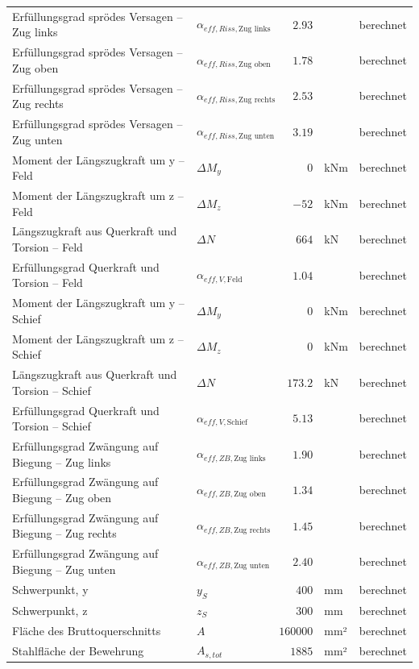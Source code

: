 \documentclass[11pt,a4paper]{article}
\begin{document}
\begin{xltabular}{\linewidth}{>{\raggedright\arraybackslash}Xlrll}
Erfüllungsgrad sprödes Versagen – Zug links & $\alpha_{eff,Riss,\text{Zug links}}$ & $2.93$ &  & berechnet \\
Erfüllungsgrad sprödes Versagen – Zug oben & $\alpha_{eff,Riss,\text{Zug oben}}$ & $1.78$ &  & berechnet \\
Erfüllungsgrad sprödes Versagen – Zug rechts & $\alpha_{eff,Riss,\text{Zug rechts}}$ & $2.53$ &  & berechnet \\
Erfüllungsgrad sprödes Versagen – Zug unten & $\alpha_{eff,Riss,\text{Zug unten}}$ & $3.19$ &  & berechnet \\
Moment der Längszugkraft um y – Feld & $\Delta M_y$ & $0$ & kNm & berechnet \\
Moment der Längszugkraft um z – Feld & $\Delta M_z$ & $-52$ & kNm & berechnet \\
Längszugkraft aus Querkraft und Torsion – Feld & $\Delta N$ & $664$ & kN & berechnet \\
Erfüllungsgrad Querkraft und Torsion – Feld & $\alpha_{eff,V,\text{Feld}}$ & $1.04$ &  & berechnet \\
Moment der Längszugkraft um y – Schief & $\Delta M_y$ & $0$ & kNm & berechnet \\
Moment der Längszugkraft um z – Schief & $\Delta M_z$ & $0$ & kNm & berechnet \\
Längszugkraft aus Querkraft und Torsion – Schief & $\Delta N$ & $173.2$ & kN & berechnet \\
Erfüllungsgrad Querkraft und Torsion – Schief & $\alpha_{eff,V,\text{Schief}}$ & $5.13$ &  & berechnet \\
Erfüllungsgrad Zwängung auf Biegung – Zug links & $\alpha_{eff,ZB,\text{Zug links}}$ & $1.90$ &  & berechnet \\
Erfüllungsgrad Zwängung auf Biegung – Zug oben & $\alpha_{eff,ZB,\text{Zug oben}}$ & $1.34$ &  & berechnet \\
Erfüllungsgrad Zwängung auf Biegung – Zug rechts & $\alpha_{eff,ZB,\text{Zug rechts}}$ & $1.45$ &  & berechnet \\
Erfüllungsgrad Zwängung auf Biegung – Zug unten & $\alpha_{eff,ZB,\text{Zug unten}}$ & $2.40$ &  & berechnet \\
Schwerpunkt, y & $y_S$ & $400$ & mm & berechnet \\
Schwerpunkt, z & $z_S$ & $300$ & mm & berechnet \\
Fläche des Bruttoquerschnitts & $A$ & $160000$ & mm² & berechnet \\
Stahlfläche der Bewehrung & $A_{s,tot}$ & $1885$ & mm² & berechnet \\

\end{xltabular}
\end{document}
